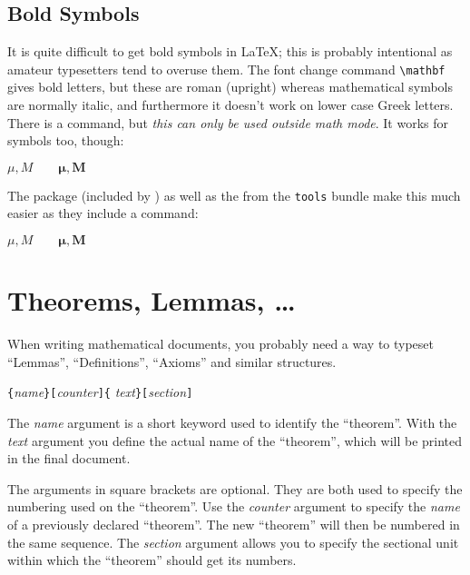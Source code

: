 

\subsection{Bold Symbols}

It is quite difficult to get bold symbols in \LaTeX{}; this is
probably intentional as amateur typesetters tend to overuse them.  The
font change command \verb|\mathbf| gives bold letters, but these are
roman (upright) whereas mathematical symbols are normally italic, and
furthermore it doesn't work on lower case Greek letters.
There is a  command, but \emph{this can only be used
outside math mode}. It works for symbols too, though:
\begin{example}
$\mu, M \qquad 
\mathbf{\mu}, \mathbf{M}$
\qquad {}
\end{example}

The package  (included by ) as well as the
 from the \texttt{tools} bundle make this much easier as they include
a  command:

\begin{example}
$\mu, M \qquad
\boldsymbol{\mu}, \boldsymbol{M}$
\end{example}


\section{Theorems, Lemmas, \ldots}

When writing mathematical documents, you probably need a way to
typeset ``Lemmas'', ``Definitions'', ``Axioms'' and similar
structures.
\begin{lscommand}
\verb|{|\emph{name}\verb|}[|\emph{counter}\verb|]{|%
         \emph{text}\verb|}[|\emph{section}\verb|]|
\end{lscommand}
The \emph{name} argument is a short keyword used to identify the
``theorem''. With the \emph{text} argument you define the actual name
of the ``theorem'', which will be printed in the final document.

The arguments in square brackets are optional. They are both used to
specify the numbering used on the ``theorem''. Use  the \emph{counter}
argument to specify the \emph{name} of a previously declared
``theorem''. The new ``theorem'' will then be numbered in the same
sequence.  The \emph{section} argument allows you to specify the
sectional unit within which the ``theorem'' should get its numbers.

